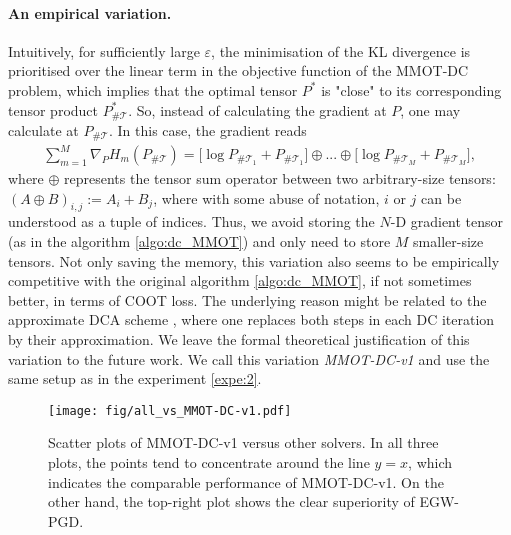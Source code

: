 \documentclass{article}
\begin{document}
\paragraph{An empirical variation.} Intuitively, for sufficiently large $\varepsilon$, the minimisation of the KL divergence is prioritised 
over the linear term in the objective function of the MMOT-DC problem, which implies that the optimal tensor $P^*$ is "close" to its 
corresponding tensor product $P^*_{\# \mathcal T}$. So, instead of calculating the gradient at $P$, one may calculate at 
$P_{\# \mathcal T}$. In this case, the gradient reads
\begin{equation*}
  \begin{split}
    \sum_{m=1}^M \nabla_P H_m(P_{\# \mathcal T}) = 
    \big[ \log P_{\# \mathcal T_1} + P_{\# \mathcal T_1} \big] \oplus ... \oplus \big[ \log P_{\# \mathcal T_M} + P_{\# \mathcal T_M} \big],
  \end{split}
\end{equation*}
where $\oplus$ represents the tensor sum operator between two arbitrary-size tensors: $(A \oplus B)_{i,j}:= A_i + B_j$, where with some 
abuse of notation, $i$ or $j$ can be understood as a tuple of indices. Thus, we avoid storing the $N$-D gradient tensor (as in the 
algorithm \ref{algo:dc_MMOT}) and only need to store $M$ smaller-size tensors. Not only saving the memory, 
this variation also seems to be empirically competitive with the original algorithm \ref{algo:dc_MMOT}, if not sometimes better, 
in terms of COOT loss. The underlying reason might be related to the approximate DCA scheme \citep{Thanh15}, where one replaces both 
steps in each DC iteration by their approximation. We leave the formal theoretical justification of this variation to the future work.
We call this variation \textit{MMOT-DC-v1} and use the same setup as in the experiment \ref{expe:2}.
\begin{figure}[ht]
  \centering
  \texttt{[image: fig/all\_vs\_MMOT-DC-v1.pdf]}
  \caption{Scatter plots of MMOT-DC-v1 versus other solvers. In all three plots, the points tend to concentrate around the line $y=x$, 
  which indicates the comparable performance of MMOT-DC-v1. On the other hand, the top-right plot shows the clear superiority of EGW-PGD.}
  \label{fig:coot_mmot_new}
\end{figure}
\end{document}

